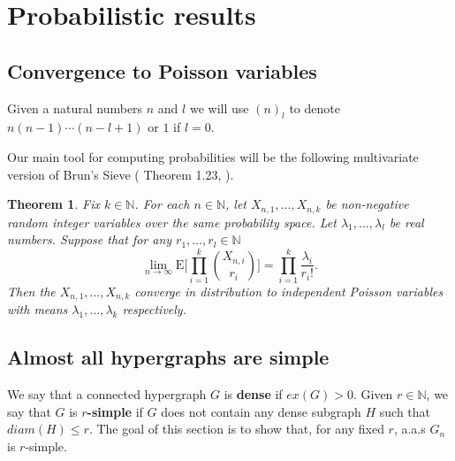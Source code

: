 \documentclass[12pt,notitlepage,a4paper]{article}
\newtheorem{theorem}{Theorem}[section]
\theoremstyle{definition}
\newcommand{\N}{\mathbb{N}}
\newcommand{\Ln}{\lim\limits_{n\to \infty}}
\begin{document}
\section{Probabilistic results}
\subsection{Convergence to Poisson variables}



Given a natural numbers $n$ and $l$ we will use 
$(n)_l$ to denote 
$n(n-1)\cdots (n-l+1)$ or $1$ if $l=0$. 

Our main tool for computing probabilities will be
the following multivariate version of Brun's Sieve (
Theorem 1.23, \cite{bollobas2001random}).


\begin{theorem} \label{thm:BrunSieve}
	Fix $k\in \N$. For each 
	$n\in \N$, let $X_{n,1},\dots, X_{n,k}$ be non-negative
	random integer variables over the same
	probability space. Let $\lambda_1,\dots,\lambda_l$ 
	be real numbers. Suppose that for any $r_1,\dots,r_l \in \N$
	\[ 
	\Ln \mathrm{E}\big[
	\prod_{i=1}^{k} \binom{X_{n,i}}{r_i} \big]
	= \prod_{i=1}^{k} \frac{\lambda_i}{r_i !}.	
	\]
	Then the $X_{n,1},\dots,X_{n,k}$ converge in distribution to
	independent Poisson variables with means $\lambda_1,\dots,\lambda_k$ 
	respectively. 
\end{theorem}



\subsection{Almost all hypergraphs are simple}


We say that a connected hypergraph $G$ is \textbf{dense} if
$ex(G)>0$. Given $r\in \N$, we say that $G$ is \textbf{$r$-simple}
if $G$ does not contain any dense subgraph $H$ such that 
$diam(H)\leq r$. The goal of this section is to show that, for any
fixed $r$, a.a.s $G_n$ is $r$-simple.\par
\end{document}
